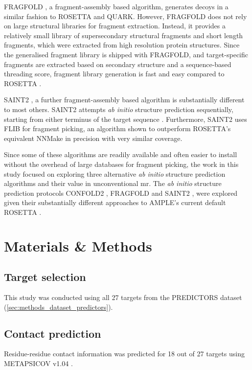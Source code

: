 FRAGFOLD \cite{Jones2001-mc}, a fragment-assembly based algorithm, generates decoys in a similar fashion to ROSETTA and QUARK. However, FRAGFOLD does not rely on large structural libraries for fragment extraction. Instead, it provides a relatively small library of supersecondary structural fragments and short length fragments, which were extracted from high resolution protein structures. Since the generalised fragment library is shipped with FRAGFOLD, and target-specific fragments are extracted based on secondary structure and a sequence-based threading score, fragment library generation is fast and easy compared to ROSETTA \cite{Kosciolek2014-bt}.

SAINT2 \cite{De_Oliveira2017-sg}, a further fragment-assembly based algorithm is substantially different to most others. SAINT2 attempts \textit{ab initio} structure prediction sequentially, starting from either terminus of the target sequence \cite{De_Oliveira2017-sg}. Furthermore, SAINT2 uses FLIB \cite{De_Oliveira2015-kb} for fragment picking, an algorithm shown to outperform ROSETTA's equivalent NNMake \cite{Gront2011-sv} in precision with very similar coverage.

Since some of these algorithms are readily available and often easier to install without the overhead of large databases for fragment picking, the work in this study focused on exploring three alternative \textit{ab initio} structure prediction algorithms and their value in unconventional \gls{mr}. The \textit{ab initio} structure prediction protocols CONFOLD2 \cite{Adhikari2018-lj}, FRAGFOLD \cite{Jones2001-mc} and SAINT2 \cite{De_Oliveira2017-sg}, were explored given their substantially different approaches to AMPLE's current default ROSETTA \cite{Rohl2004-dj}.

\section{Materials \& Methods}
\subsection{Target selection}
This study was conducted using all 27 targets from the PREDICTORS dataset (\cref{sec:methods_dataset_predictors}).

\subsection{Contact prediction}
Residue-residue contact information was predicted for 18 out of 27 targets using METAPSICOV v1.04 \cite{Jones2015-vq}.

